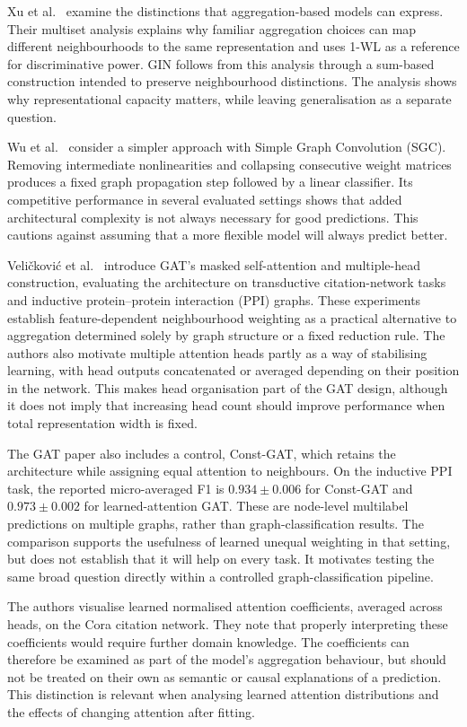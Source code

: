 \documentclass[11pt,a4paper]{article}
\begin{document}
Xu et al.~\cite{xu2019powerful} examine the distinctions that aggregation-based models can express. Their multiset analysis explains why familiar aggregation choices can map different neighbourhoods to the same representation and uses 1-WL as a reference for discriminative power. GIN follows from this analysis through a sum-based construction intended to preserve neighbourhood distinctions. The analysis shows why representational capacity matters, while leaving generalisation as a separate question.

Wu et al.~\cite{wu2019simplifying} consider a simpler approach with Simple Graph Convolution (SGC). Removing intermediate nonlinearities and collapsing consecutive weight matrices produces a fixed graph propagation step followed by a linear classifier. Its competitive performance in several evaluated settings shows that added architectural complexity is not always necessary for good predictions. This cautions against assuming that a more flexible model will always predict better.

Veli\v{c}kovi\'{c} et al.~\cite{velickovic2018gat} introduce GAT's masked self-attention and multiple-head construction, evaluating the architecture on transductive citation-network tasks and inductive protein--protein interaction (PPI) graphs. These experiments establish feature-dependent neighbourhood weighting as a practical alternative to aggregation determined solely by graph structure or a fixed reduction rule. The authors also motivate multiple attention heads partly as a way of stabilising learning, with head outputs concatenated or averaged depending on their position in the network. This makes head organisation part of the GAT design, although it does not imply that increasing head count should improve performance when total representation width is fixed.

The GAT paper also includes a control, Const-GAT, which retains the architecture while assigning equal attention to neighbours. On the inductive PPI task, the reported micro-averaged F1 is \(0.934\pm0.006\) for Const-GAT and \(0.973\pm0.002\) for learned-attention GAT. These are node-level multilabel predictions on multiple graphs, rather than graph-classification results. The comparison supports the usefulness of learned unequal weighting in that setting, but does not establish that it will help on every task. It motivates testing the same broad question directly within a controlled graph-classification pipeline.

The authors visualise learned normalised attention coefficients, averaged across heads, on the Cora citation network. They note that properly interpreting these coefficients would require further domain knowledge. The coefficients can therefore be examined as part of the model's aggregation behaviour, but should not be treated on their own as semantic or causal explanations of a prediction. This distinction is relevant when analysing learned attention distributions and the effects of changing attention after fitting.
\end{document}
